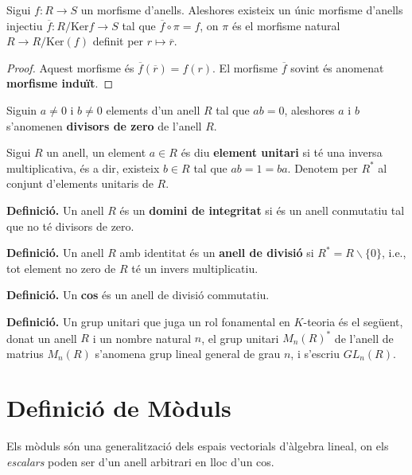 \begin{theorem}
Sigui $f:R\rightarrow S$ un morfisme d'anells.  Aleshores existeix un únic morfisme d'anells injectiu $\overline{f}:R/ \text{Ker}f \rightarrow S$ tal que $\overline{f}\circ \pi=f$, on $\pi$ és el morfisme natural $R\rightarrow R/\text{Ker} (f)$ definit per $r\mapsto \overline{r}$.
\end{theorem}
\begin{proof}
Aquest morfisme és $\overline{f}(\overline{r})=f(r)$. El morfisme $\overline{f}$ sovint és anomenat \textbf{morfisme induït}.
\end{proof}
\begin{definition} Siguin $a\neq 0$ i $b\neq 0$ elements d'un anell $R$ tal que $ab=0$, aleshores $a$ i $b$ s'anomenen \textbf{divisors de zero} de l'anell $R$.
\end{definition}
\begin{definition} Sigui $R$ un anell, un element $a\in R$ és diu \textbf{element unitari} si té una inversa multiplicativa, és a dir, existeix $b\in R$ tal que $ab=1=ba$. Denotem per $R^*$ al conjunt d'elements unitaris de $R$.
\end{definition}
\begin{definition}
\textbf{Definició.} Un anell $R$ és un \textbf{domini de integritat} si és un anell conmutatiu tal que no té divisors de zero.
\end{definition}
\begin{definition}
\textbf{Definició.} Un anell $R$ amb identitat és un \textbf{anell de divisió} si $R^*=R \backslash \{0\}$, i.e., tot element no zero de $R$ té un invers multiplicatiu.
\end{definition}
\begin{definition}
\textbf{Definició.} Un \textbf{cos} és un anell de divisió commutatiu.
\end{definition}
\begin{definition}
\textbf{Definició.} Un grup unitari que juga un rol fonamental en $K$-teoria és el següent, donat un anell $R$ i un nombre natural $n$, el grup unitari $M_n(R)^*$ de l'anell de matrius $M_n(R)$ s'anomena grup lineal general de grau $n$, i s'escriu $GL_n(R)$.
\end{definition}

\section{Definició de Mòduls}
Els mòduls són una generalització dels espais vectorials d'àlgebra lineal, on els \textit{escalars} poden ser d'un anell arbitrari en lloc d'un cos.

